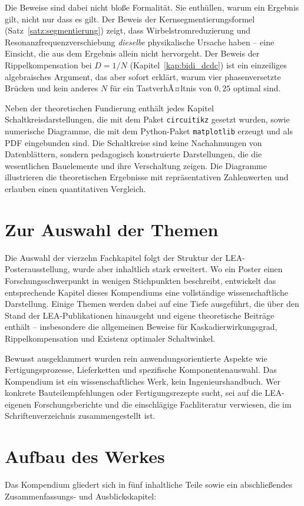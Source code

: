 ﻿\documentclass[a4paper,12pt,openany,oneside]{book}
\newcommand{\abschnitt}[1]{\section{#1}}
\theoremstyle{definition}
\begin{document}
Die Beweise sind dabei nicht blo\ss{}e Formalit\"at. Sie enth\"ullen, warum ein Ergebnis
gilt, nicht nur dass es gilt. Der Beweis der Kernsegmentierungsformel
(Satz~\ref{satz:segmentierung}) zeigt, dass Wirbelstromreduzierung und
Resonanzfrequenzverschiebung \emph{dieselbe} physikalische Ursache haben -- eine
Einsicht, die aus dem Ergebnis allein nicht hervorgeht. Der Beweis der
Rippelkompensation bei $D = 1/N$ (Kapitel~\ref{kap:bidi_dcdc}) ist ein einzeiliges
algebraisches Argument, das aber sofort erkl\"art, warum vier phasenversetzte Br\"ucken
und kein anderes $N$ f\"ur ein TastverhÃ¤ltnis von $0{,}25$ optimal sind.

Neben der theoretischen Fundierung enth\"alt jedes Kapitel Schaltkreisdarstellungen,
die mit dem Paket \texttt{circuitikz} gesetzt wurden, sowie numerische Diagramme,
die mit dem Python-Paket \texttt{matplotlib} erzeugt und als PDF eingebunden sind.
Die Schaltkreise sind keine Nachahmungen von Datenbl\"attern, sondern pedagogisch
konstruierte Darstellungen, die die wesentlichen Bauelemente und ihre Verschaltung
zeigen. Die Diagramme illustrieren die theoretischen Ergebnisse mit repr\"asentativen
Zahlenwerten und erlauben einen quantitativen Vergleich.

\abschnitt{Zur Auswahl der Themen}

Die Auswahl der vierzehn Fachkapitel folgt der Struktur der LEA-Posterausstellung,
wurde aber inhaltlich stark erweitert. Wo ein Poster einen Forschungsschwerpunkt in
wenigen Stichpunkten beschreibt, entwickelt das entsprechende Kapitel dieses
Kompendiums eine vollst\"andige wissenschaftliche Darstellung. Einige Themen werden
dabei auf eine Tiefe ausgef\"uhrt, die \"uber den Stand der LEA-Publikationen hinausgeht
und eigene theoretische Beitr\"age enth\"alt -- insbesondere die allgemeinen Beweise
f\"ur Kaskadierwirkungsgrad, Rippelkompensation und Existenz optimaler Schaltwinkel.

Bewusst ausgeklammert wurden rein anwendungsorientierte Aspekte wie Fertigungsprozesse,
Lieferketten und spezifische Komponentenauswahl. Das Kompendium ist ein wissenschaftliches
Werk, kein Ingenieurshandbuch. Wer konkrete Bauteilempfehlungen oder Fertigungsrezepte
sucht, sei auf die LEA-eigenen Forschungsberichte und die einschl\"agige Fachliteratur
verwiesen, die im Schriftenverzeichnis zusammengestellt ist.

\abschnitt{Aufbau des Werkes}

Das Kompendium gliedert sich in f\"unf inhaltliche Teile sowie ein abschlie\ss{}endes
Zusammenfassungs- und Ausblickskapitel:
\end{document}
